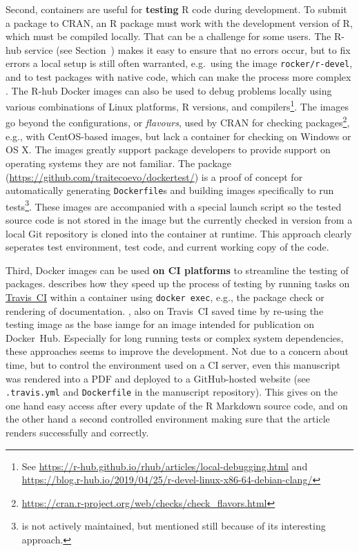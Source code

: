 Second, containers are useful for \textbf{testing} R code during
development. To submit a package to CRAN, an R package must work with
the development version of R, which must be compiled locally. That can
be a challenge for some users. The R-hub service (see
Section~) makes it easy to ensure that no errors occur,
but to fix errors a local setup is still often warranted, e.g.~using the
image \texttt{rocker/r-devel}, and to test packages with native code,
which can make the process more complex
\citep[cf.][]{eckert_building_2018}. The R-hub Docker images can also be
used to debug problems locally using various combinations of Linux
platforms, R versions, and
compilers\footnote{See \href{https://r-hub.github.io/rhub/articles/local-debugging.html}{https://r-hub.github.io/rhub/articles/local-debugging.html} and \href{https://blog.r-hub.io/2019/04/25/r-devel-linux-x86-64-debian-clang/}{https://blog.r-hub.io/2019/04/25/r-devel-linux-x86-64-debian-clang/}}.
The images go beyond the configurations, or \emph{flavours}, used by
CRAN for checking
packages\footnote{\href{https://cran.r-project.org/web/checks/check_flavors.html}{https://cran.r-project.org/web/checks/check\_flavors.html}},
e.g., with CentOS-based images, but lack a container for checking on
Windows or OS X. The images greatly support package developers to
provide support on operating systems they are not familiar. The package
 (\url{https://github.com/traitecoevo/dockertest/}) is a
proof of concept for automatically generating \texttt{Dockerfile}s and
building images specifically to run
tests\footnote{ is not actively maintained, but mentioned still because of its interesting approach.}.
These images are accompanied with a special launch script so the tested
source code is not stored in the image but the currently checked in
version from a local Git repository is cloned into the container at
runtime. This approach clearly seperates test environment, test code,
and current working copy of the code.

Third, Docker images can be used \textbf{on CI platforms} to streamline
the testing of packages. \citet{ye_docker_2019} describes how they speed
up the process of testing by running tasks on
\href{https://travis-ci.org/}{Travis~CI} within a container using
\texttt{docker\ exec}, e.g., the package check or rendering of
documentation. \citet{cardozo_faster_2018}, also on Travis~CI saved time
by re-using the testing image as the base iamge for an image intended
for publication on Docker~Hub. Especially for long running tests or
complex system dependencies, these approaches seems to improve the
development. Not due to a concern about time, but to control the
environment used on a CI server, even this manuscript was rendered into
a PDF and deployed to a GitHub-hosted website (see \texttt{.travis.yml}
and \texttt{Dockerfile} in the manuscript repository). This gives on the
one hand easy access after every update of the R Markdown source code,
and on the other hand a second controlled environment making sure that
the article renders successfully and correctly.

